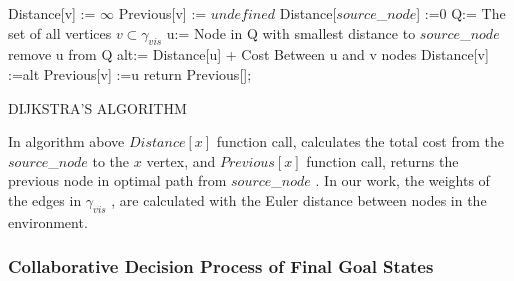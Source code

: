 \documentclass[twoside]{article}
\begin{document}
		\begin{algorithm}[H]
       	
		{		
             Distance[v] := $\infty$ \;
			  Previous[v] := $undefined$ \;
		}
		Distance[$source$\_$ node$] :=0  \;
		Q:= The set of all vertices $v \subset \gamma_{vis}$ \;
		{
			u:= Node in Q with smallest distance to $source$\_$ node$\;
			remove u from Q\;
			{
				alt:= Distance[u] + Cost Between u and v nodes\;
				{
					Distance[v] :=alt\;
					Previous[v] :=u\;
					}
				}
			}
			return Previous[];
				
			\caption{DIJKSTRA'S ALGORITHM}
		\end{algorithm}
		In algorithm above $Distance[x]$ function call, calculates the total cost from the $source$\_$ node$ to the $x$ vertex, and $Previous[x]$ function call, returns the previous node in optimal path from $source$\_$ node$ .
	In our work, the weights of the edges in $\gamma_{vis}$ , are calculated with the Euler distance between nodes in the environment.  
	
	
	\subsubsection{Collaborative Decision Process of Final Goal States}
	
\end{document}
